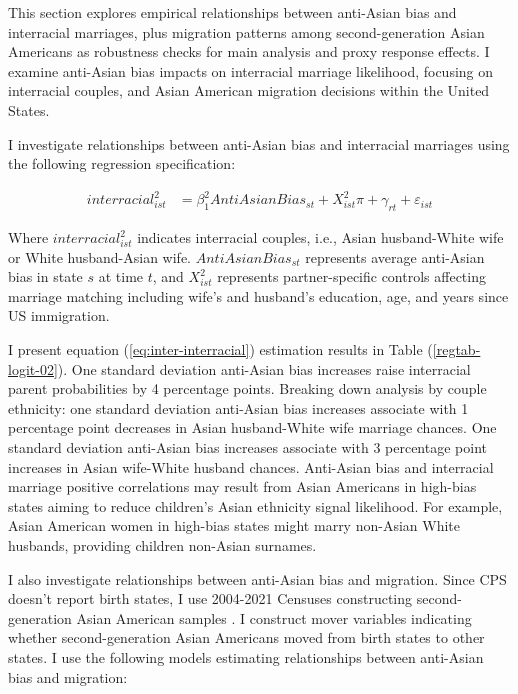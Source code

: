 This section explores empirical relationships between anti-Asian bias and interracial marriages, plus migration patterns among second-generation Asian Americans as robustness checks for main analysis and proxy response effects. I examine anti-Asian bias impacts on interracial marriage likelihood, focusing on interracial couples, and Asian American migration decisions within the United States.

I investigate relationships between anti-Asian bias and interracial marriages using the following regression specification:

\begin{align}
interracial_{ist}^2 &= \beta_1^2 AntiAsianBias_{st} + X_{ist}^2\pi + \gamma_{rt} 
            + \varepsilon_{ist}  \label{eq:inter-interracial} 
\end{align}

Where $interracial_{ist}^2$ indicates interracial couples, i.e., Asian husband-White wife or White husband-Asian wife. $AntiAsianBias_{st}$ represents average anti-Asian bias in state $s$ at time $t$, and $X_{ist}^2$ represents partner-specific controls affecting marriage matching including wife's and husband's education, age, and years since US immigration.

I present equation (\ref{eq:inter-interracial}) estimation results in Table (\ref{regtab-logit-02}). One standard deviation anti-Asian bias increases raise interracial parent probabilities by 4 percentage points. Breaking down analysis by couple ethnicity: one standard deviation anti-Asian bias increases associate with 1 percentage point decreases in Asian husband-White wife marriage chances. One standard deviation anti-Asian bias increases associate with 3 percentage point increases in Asian wife-White husband chances. Anti-Asian bias and interracial marriage positive correlations may result from Asian Americans in high-bias states aiming to reduce children's Asian ethnicity signal likelihood. For example, Asian American women in high-bias states might marry non-Asian White husbands, providing children non-Asian surnames.

I also investigate relationships between anti-Asian bias and migration. Since CPS doesn't report birth states, I use 2004-2021 Censuses constructing second-generation Asian American samples \autocite{floodsarahIntegratedPublicUse2021}. I construct mover variables indicating whether second-generation Asian Americans moved from birth states to other states. I use the following models estimating relationships between anti-Asian bias and migration:

